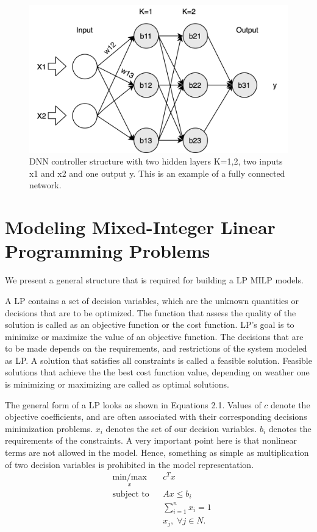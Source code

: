 \begin{figure}
	\centering
	\includegraphics[width=0.7\linewidth]{Images/DNNstructure}
	\caption[DNN structure]{DNN controller structure with two hidden layers K=1,2, two inputs x1 and x2 and one output y. This is an example of a fully connected network.}
	\label{fig:dnn-controller}
\end{figure}

\section{Modeling Mixed-Integer Linear Programming Problems}

We present a general structure that is required for building a \ac{LP} \ac{MILP} models. 

A \ac{LP} contains a set of decision variables, which are the unknown quantities or decisions that are to be optimized. 
The function that assess the quality of the solution is called as an objective function or the cost function.
\ac{LP}'s goal is to minimize or maximize the value of an objective function. 
The decisions that are to be made depends on the requirements, and restrictions of the  system modeled as \ac{LP}.
A  solution that satisfies all constraints is called a feasible solution. 
Feasible solutions that achieve the the best cost function value, depending on weather one is minimizing or maximizing are called as optimal solutions. 


The general form of a \ac{LP} looks as shown in Equations 2.1. 
Values of $c$ denote the objective coefficients, and are often associated with their corresponding decisions minimization problems. 
$x_i$ denotes the set of our decision variables.
$b_i$ denotes the requirements of the constraints. 
A very important point here is that nonlinear terms are not allowed in the model. 
Hence, something as simple as multiplication of two decision variables is prohibited in the model representation. 
\begin{equation}
\begin{aligned}
& \underset{x}{\text{min/max}}
& & c^T x \\
& \text{subject to} & &  Ax \leq b_i \\
& & &  \sum_{i=1}^{n} x_i =1 \\
& & &  x_j, \; \forall j \in N. \\
\end{aligned}
\end{equation}

